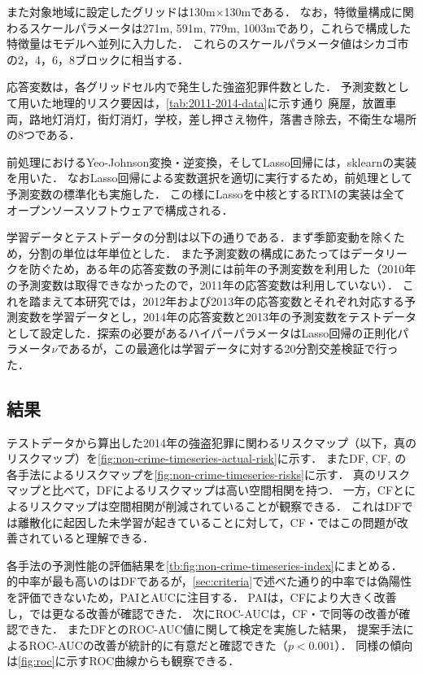 また対象地域に設定したグリッドは130m$\times$130mである．
なお，特徴量構成に関わるスケールパラメータは271m, 591m, 779m, 1003mであり，これらで構成した特徴量はモデルへ並列に入力した．
これらのスケールパラメータ値はシカゴ市の2，4，6，8ブロックに相当する．

応答変数は，各グリッドセル内で発生した強盗犯罪件数とした．
予測変数として用いた地理的リスク要因は，\cref{tab:2011-2014-data}に示す通り
廃屋，放置車両，路地灯消灯，街灯消灯，学校，差し押さえ物件，落書き除去，不衛生な場所
の8つである．

前処理におけるYeo-Johnson変換・逆変換，そしてLasso回帰には，sklearn\cite{scikit-learn}の実装を用いた．
なおLasso回帰による変数選択を適切に実行するため，前処理として予測変数の標準化も実施した．
この様にLassoを中核とするRTMの実装は全てオープンソースソフトウェアで構成される．

学習データとテストデータの分割は以下の通りである．まず季節変動を除くため，分割の単位は年単位とした．
また予測変数の構成にあたってはデータリークを防ぐため，ある年の応答変数の予測には前年の予測変数を利用した（2010年の予測変数は取得できなかったので，2011年の応答変数は利用していない）．
これを踏まえて本研究では，2012年および2013年の応答変数とそれぞれ対応する予測変数を学習データとし，2014年の応答変数と2013年の予測変数をテストデータとして設定した．探索の必要があるハイパーパラメータはLasso回帰の正則化パラメータ$\nu$であるが，この最適化は学習データに対する20分割交差検証で行った．

\subsection{結果}
テストデータから算出した2014年の強盗犯罪に関わるリスクマップ（以下，真のリスクマップ）を\cref{fig:non-crime-timeseries-actual-risk}に示す．
またDF, CF, \cfsq の各手法によるリスクマップを\cref{fig:non-crime-timeseries-risks}に示す．
真のリスクマップと比べて，DFによるリスクマップは高い空間相関を持つ．
一方，CFと\cfsq によるリスクマップは空間相関が削減されていることが観察できる．
これはDFでは離散化に起因した未学習が起きていることに対して，CF・\cfsq ではこの問題が改善されていると理解できる．

各手法の予測性能の評価結果を\cref{tb:fig:non-crime-timeseries-index}にまとめる．
的中率が最も高いのはDFであるが，\cref{sec:criteria}で述べた通り的中率では偽陽性を評価できないため，PAIとAUCに注目する．
PAIは，CFにより大きく改善し，\cfsq では更なる改善が確認できた．
次にROC-AUCは，CF・\cfsq で同等の改善が確認できた．
またDFと\cfsq のROC-AUC値に関して検定\cite{DeLong}を実施した結果，
提案手法によるROC-AUCの改善が統計的に有意だと確認できた（$p<0.001$）．
同様の傾向は\cref{fig:roc}に示すROC曲線からも観察できる．


